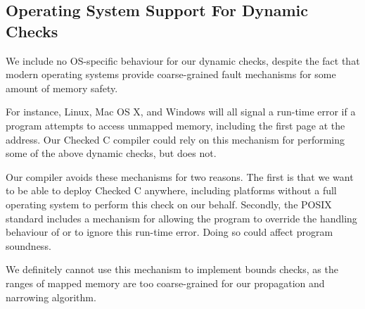 \subsection{Operating System Support For Dynamic Checks}

We include no OS-specific behaviour for our dynamic checks, despite
the fact that modern operating systems provide coarse-grained fault
mechanisms for some amount of memory safety.

For instance, Linux, Mac OS X, and Windows will all signal a run-time
error if a program attempts to access unmapped memory, including the
first page at the \NULL{} address. Our Checked C compiler could rely on this mechanism for performing some of the above dynamic checks, but does not.

Our compiler avoids these mechanisms for two reasons. The first is
that we want to be able to deploy Checked C anywhere, including
platforms without a full operating system to perform this check on our
behalf. Secondly, the POSIX standard includes a mechanism for allowing
the program to override the handling behaviour of or to ignore this
run-time error. Doing so could affect program soundness.

We definitely cannot use this mechanism to implement bounds checks, as
the ranges of mapped memory are too coarse-grained for our propagation
and narrowing algorithm.


